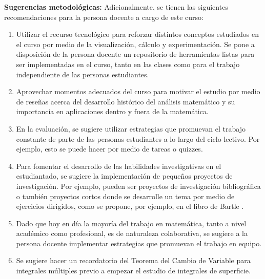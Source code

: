 \begin{refsection}
\textbf{Sugerencias metodológicas:} Adicionalmente, se tienen las siguientes recomendaciones para la persona docente a cargo de este curso:
\begin{enumerate}
    \item Utilizar el recurso tecnológico para reforzar distintos conceptos estudiados en el curso por medio de la visualización, cálculo y experimentación. Se pone a disposición de la persona docente un repositorio de herramientas listas para ser implementadas en el curso, tanto en las clases como para el trabajo independiente de las personas estudiantes.
    \item Aprovechar momentos adecuados del curso para motivar el estudio por medio de reseñas acerca del desarrollo histórico del análisis matemático y su importancia en aplicaciones dentro y fuera de la matemática.
    \item En la evaluación, se sugiere utilizar estrategias que promuevan el trabajo constante de parte de las personas estudiantes a lo largo del ciclo lectivo. Por ejemplo, esto se puede hacer por medio de tareas o quizzes.
    \item Para fomentar el desarrollo de las habilidades investigativas en el estudiantado, se sugiere la implementación de pequeños proyectos de investigación. Por ejemplo, pueden ser proyectos de investigación bibliográfica o también proyectos cortos donde se desarrolle un tema por medio de ejercicios dirigidos, como se propone, por ejemplo, en el libro de Bartle \cite{Bar76}.
    \item Dado que hoy en día la mayoría del trabajo en matemática, tanto a nivel académico como profesional, es de naturaleza colaborativa, se sugiere a la persona docente implementar estrategias que promuevan el trabajo en equipo.
    \item Se sugiere hacer un recordatorio del Teorema del Cambio de Variable para integrales múltiples previo a empezar el estudio de integrales de superficie.
\end{enumerate}




\nocite{Abb15}
\nocite{Apo84}
\nocite{Apo85} 
\nocite{Bar76}
\nocite{BS11}
\nocite{Apo76}
\nocite{Ros13}
\nocite{TBB08}
\nocite{Rud76}
\nocite{Piz06}
\nocite{Buc03}
\nocite{Fit09}
\nocite{Spi65}
\nocite{MT03}

\printcursosbibliography
\end{refsection}

